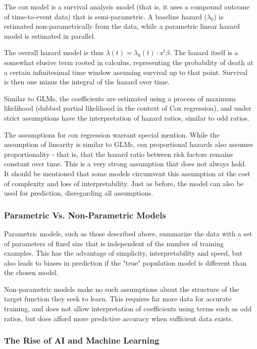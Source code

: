 \documentclass[a4paper,12pt]{article}
\begin{document}
			The cox model is a survival analysis model (that is, it uses a compound outcome of time-to-event data) that is semi-parametric. A baseline hazard ($ \lambda_0 $) is estimated non-parametrically from the data, while a parametric linear hazard model is estimated in parallel\cite{Cox1972}.
			
			The overall hazard model is thus $ \lambda(t) = \lambda_0(t) \cdot x^t \beta $. The hazard itself is a somewhat elusive term rooted in calculus, representing the probability of death at a certain infinitesimal time window assuming survival up to that point. Survival is then one minus the integral of the hazard over time.
			
			Similar to GLMs, the coefficients are estimated using a process of maximum likelihood (dubbed partial likelihood in the context of Cox regression), and under strict assumptions have the interpretation of hazard ratios, similar to odd ratios.
			
			The assumptions for cox regression warrant special mention. While the assumption of linearity is similar to GLMs, cox proportional hazards also assumes proportionality - that is, that the hazard ratio between risk factors remains constant over time. This is a very strong assumption that does not always hold. It should be mentioned that some models circumvent this assumption at the cost of complexity and loss of interpretability. Just as before, the model can also be used for prediction, disregarding all assumptions.
			
			\subsubsection{Parametric Vs. Non-Parametric Models}
			Parametric models, such as those described above, summarize the data with a set of parameters of fixed size that is independent of the number of training examples. This has the advantage of simplicity, interpretability and speed, but also leads to biases in prediction if the "true" population model is different than the chosen model.
			
			Non-parametric models make no such assumptions about the structure of the target function they seek to learn. This requires far more data for accurate training, and does not allow interpretation of coefficients using terms such as odd ratios, but does afford more predictive accuracy when sufficient data exists\cite{Russell2002}.
			
			\subsubsection{The Rise of AI and Machine Learning}
		
\end{document}
